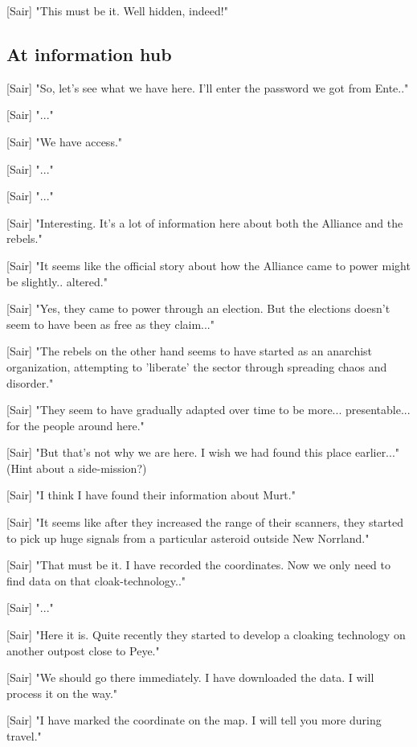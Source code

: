 \documentclass[a4paper,12pt]{article}
\begin{document}
[Sair] "This must be it. Well hidden, indeed!"

\subsection{At information hub}

[Sair] "So, let's see what we have here. I'll enter the password we got from Ente.."

[Sair] "..."

[Sair] "We have access."

[Sair] "..."

[Sair] "..."

[Sair] "Interesting. It's a lot of information here about both the Alliance and the rebels."

[Sair] "It seems like the official story about how the Alliance came to power might be slightly.. altered."

[Sair] "Yes, they came to power through an election. But the elections doesn't seem to have been as free as they claim..."

[Sair] "The rebels on the other hand seems to have started as an anarchist organization, attempting to 'liberate' the sector
through spreading chaos and disorder."

[Sair] "They seem to have gradually adapted over time to be more... presentable... for the people around here."

[Sair] "But that's not why we are here. I wish we had found this place earlier..." (Hint about a side-mission?)

[Sair] "I think I have found their information about Murt."

[Sair] "It seems like after they increased the range of their scanners, they started to pick up huge signals from a particular asteroid outside New Norrland."

[Sair] "That must be it. I have recorded the coordinates. Now we only need to find data on that cloak-technology.."

[Sair] "..."

[Sair] "Here it is. Quite recently they started to develop a cloaking technology on another outpost close to Peye."

[Sair] "We should go there immediately. I have downloaded the data. I will process it on the way."

[Sair] "I have marked the coordinate on the map. I will tell you more during travel."
\end{document}
